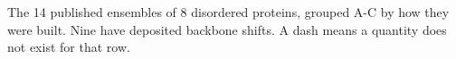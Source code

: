 The 14 published ensembles of 8 disordered proteins, grouped A-C by how they were built. Nine have deposited backbone shifts. A dash means a quantity does not exist for that row.
